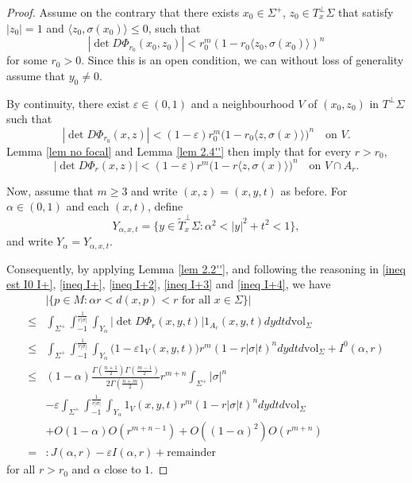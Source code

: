 \documentclass[11pt, reqno]{amsart}
\numberwithin{equation}{section}
\begin{document}
\begin{proof}

Assume on the contrary that there exists $x_{0}\in \Sigma^+$, $z_{0}\in {T}_{x}^{\perp}\Sigma$ that satisfy $|z_{0}|=1$ and $\langle z_0, \sigma(x_0)\rangle \le0$, such that
$$
\left|\det D \Phi_{r_{0}}(x_{0}, z_0)\right| < r_{0}^m\left(1-r_0\langle z_0, \sigma(x_0)\rangle \right)^n
$$
for some $r_{0}>0$. Since this is an open condition, we can without loss of generality assume that $y_0\ne0$.

By continuity, there exist $\varepsilon\in(0, 1)$ and a neighbourhood $V$ of $(x_{0}, z_0)$ in $T^{\perp}\Sigma$ such that
$$
\left|\det D\Phi_{r_{0}}(x, z)\right|
< (1-\varepsilon) r_{0}^{m} \bigl(1-r_{0}\langle z, \sigma(x)\rangle \bigr)^{n}
\quad\text{on } V.
$$
Lemma \ref{lem no focal} and Lemma \ref{lem 2.4''} then imply that for every $r>r_{0}$,
$$
\left|\det D\Phi_{r}(x, z)\right|
< (1-\varepsilon) r^{m} \bigl(1-r \langle z, \sigma(x)\rangle \bigr)^{n}
\quad\text{on } V\cap A_{r}.
$$

Now, assume that $m\ge 3$ and write $(x, z)=(x, y, t)$ as before.
For $\alpha\in(0, 1)$ and each $(x, t)$, define
$$
Y_{\alpha, x, t}
=\bigl\{ y\in\widetilde T_{x}^{\perp}\Sigma:
\alpha^{2}<|y|^{2}+t^{2}<1\bigr\},
$$
and write $Y_{\alpha}=Y_{\alpha, x, t}$.

Consequently, by applying Lemma \ref{lem 2.2''}, and following the reasoning in \eqref{ineq est I0 I+}, \eqref{ineq I+}, \eqref{ineq I+2}, \eqref{ineq I+3} and \eqref{ineq I+4}, we have
\begin{equation}\label{ineq est equality case}
\begin{aligned}
& |\{p \in M: \alpha r<d(x, p)<r \text { for all } x \in \Sigma\}| \\
\le& \int_{\Sigma^+} \int_{-1}^{\frac{1}{r|\sigma|}} \int_{Y_\alpha}
\left|\det D \Phi_r(x, y, t)\right| 1_{A_r}(x, y, t) d y d t d \mathrm{vol}_{\Sigma} \\
\le& \int_{\Sigma^+} \int_{-1}^{\frac{1}{r|\sigma|}} \int_{Y_\alpha}
\big(1-\varepsilon 1_{V}(x, y, t)\big) r^m\left(1-r|\sigma| t\right)^n d y d t d \mathrm{vol}_{\Sigma}+I^{0}(\alpha, r)\\
\le&
(1-\alpha)\frac{\Gamma\left(\frac{n+1}{2}\right) \Gamma\left(\frac{m-1}{2}\right)}{2 \Gamma\left(\frac{n+m}{2}\right)} r^{m+n}\int_{\Sigma^+}|\sigma|^n\\
& - \varepsilon \int_{\Sigma^+} \int_{-1}^{\frac{1}{r|\sigma|}} \int_{Y_\alpha}
1_{V}(x, y, t) r^m\left(1-r|\sigma| t\right)^n d y d t d \mathrm{vol}_{\Sigma}\\
& +O(1-\alpha)O\left(r^{m+n-1}\right) +O((1-\alpha)^2)O(r^{m+n})\\
=&:J(\alpha, r)-\varepsilon I(\alpha, r)+\mathrm{remainder}
\end{aligned}
\end{equation}
for all $r>r_{0}$ and $\alpha$ close to $1$.


\end{proof}
\end{document}
